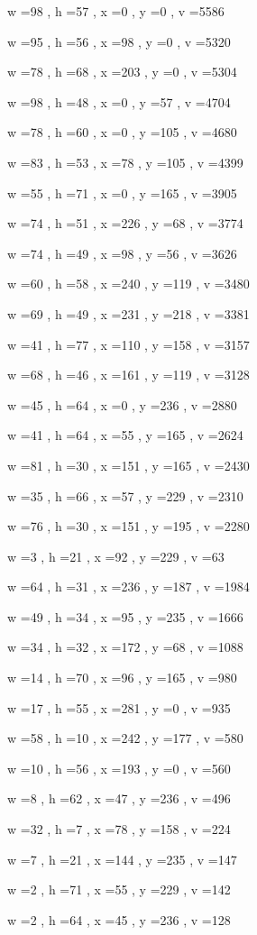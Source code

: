 \documentclass[11pt]{article}
\begin{document}
w =98 , h =57 , x =0 , y =0 , v =5586
\par
w =95 , h =56 , x =98 , y =0 , v =5320
\par
w =78 , h =68 , x =203 , y =0 , v =5304
\par
w =98 , h =48 , x =0 , y =57 , v =4704
\par
w =78 , h =60 , x =0 , y =105 , v =4680
\par
w =83 , h =53 , x =78 , y =105 , v =4399
\par
w =55 , h =71 , x =0 , y =165 , v =3905
\par
w =74 , h =51 , x =226 , y =68 , v =3774
\par
w =74 , h =49 , x =98 , y =56 , v =3626
\par
w =60 , h =58 , x =240 , y =119 , v =3480
\par
w =69 , h =49 , x =231 , y =218 , v =3381
\par
w =41 , h =77 , x =110 , y =158 , v =3157
\par
w =68 , h =46 , x =161 , y =119 , v =3128
\par
w =45 , h =64 , x =0 , y =236 , v =2880
\par
w =41 , h =64 , x =55 , y =165 , v =2624
\par
w =81 , h =30 , x =151 , y =165 , v =2430
\par
w =35 , h =66 , x =57 , y =229 , v =2310
\par
w =76 , h =30 , x =151 , y =195 , v =2280
\par
w =3 , h =21 , x =92 , y =229 , v =63
\par
w =64 , h =31 , x =236 , y =187 , v =1984
\par
w =49 , h =34 , x =95 , y =235 , v =1666
\par
w =34 , h =32 , x =172 , y =68 , v =1088
\par
w =14 , h =70 , x =96 , y =165 , v =980
\par
w =17 , h =55 , x =281 , y =0 , v =935
\par
w =58 , h =10 , x =242 , y =177 , v =580
\par
w =10 , h =56 , x =193 , y =0 , v =560
\par
w =8 , h =62 , x =47 , y =236 , v =496
\par
w =32 , h =7 , x =78 , y =158 , v =224
\par
w =7 , h =21 , x =144 , y =235 , v =147
\par
w =2 , h =71 , x =55 , y =229 , v =142
\par
w =2 , h =64 , x =45 , y =236 , v =128
\par
\newpage
\end{document}
